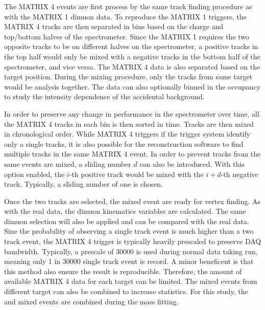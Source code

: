 \documentclass[../main.tex]{subfiles}
\begin{document}
The MATRIX 4 events are first process by the same track finding procedure as with 
the MATRIX 1 dimuon data. 
To reproduce the MATRIX 1 triggers, the MATRIX 4 tracks are then separated in bins
based on the charge and top/bottom halves of the spectrometer. Since the MATRIX 1
requires the two opposite tracks to be on different halves on the spectrometer,
a positive tracks in the top half would only be mixed with a negative tracks in the 
bottom half of the spectrometer, and vice versa. The MATRIX 4 data is also separated
based on the target position. During the mixing procedure, only the tracks from same
target would be analysis together.
The data can also optionally binned in the occupancy to study the intensity dependence
of the accidental background. 

In order to preserve any change in performance in the spectrometer over time, all the
MATRIX 4 tracks in each bin is then sorted in time. Tracks are then mixed in chronological order.
While MATRIX 4 triggers if the trigger system identify only a single tracks, it is also
possible for the reconstruction software to find multiple tracks in the same MATRIX 4 event.
In order to prevent tracks from the same events are mixed, a sliding number $d$ can also be introduced.
With this option enabled, the $i$-th positive track would be mixed with the $i+d$-th negative track.
Typically, a sliding number of one is chosen.


Once the two tracks are selected, the mixed event are ready for vertex finding. As with the 
real data, the dimuon kinematics variables are calculated. The same dimuon selection will
also be applied and can be compared with the real data. Sine the probability of observing a
single track event is much higher than a two track event, the MATRIX 4 trigger is typically
heavily prescaled to preserve DAQ bandwidth. Typically, a prescale of \num{30000} is used during
normal data taking run, meaning only \num{1} in \num{30000} single track event is record.
A minor beneficent is that this method also ensure the result is reproducible.
Therefore, the amount of available MATRIX 4 data for each target can be limited. The mixed events
from different target can also be combined to increase statistics. For this study, the 
and  mixed events are combined during the mass fitting.
\end{document}

